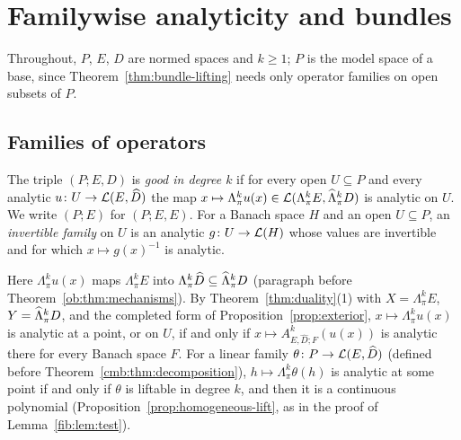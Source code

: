 \section{Familywise analyticity and bundles}\label{sec:families}

Throughout, $P$, $E$, $D$ are normed spaces and $k\ge1$; $P$ is the model space of a base, since
Theorem~\ref{thm:bundle-lifting} needs only operator families on open subsets of $P$.

\subsection{Families of operators}\label{fam2:ssec:framework}

\begin{definition}\label{fam2:def:good}
The triple $(P;E,D)$ is \emph{good in degree $k$} if for every open $U\subseteq P$ and every analytic
$u\colon U\to\mathcal L(E,\widehat D)$ the map $x\mapsto\Lambda^k_\pi u(x)\in\mathcal L(\Lambda^k_\pi E,\widehat\Lambda^k_\pi D)$ is analytic on
$U$. We write $(P;E)$ for $(P;E,E)$. For a Banach space $H$ and an open $U\subseteq P$, an \emph{invertible family} on $U$
is an analytic $g\colon U\to\mathcal L(H)$ whose values are invertible and for which $x\mapsto g(x)^{-1}$ is analytic.
\end{definition}

Here $\Lambda^k_\pi u(x)$ maps $\Lambda^k_\pi E$ into $\Lambda^k_\pi\widehat D\subseteq\widehat\Lambda^k_\pi D$ (paragraph before
Theorem~\ref{ob:thm:mechanisms}). By Theorem~\ref{thm:duality}(1) with $X=\Lambda^k_\pi E$, $Y=\widehat\Lambda^k_\pi D$, and the
completed form of Proposition~\ref{prop:exterior}, $x\mapsto\Lambda^k_\pi u(x)$ is analytic at a point, or on $U$, if and
only if $x\mapsto A^k_{E,\widehat D;F}(u(x))$ is analytic there for every Banach space $F$. For a linear family
$\theta\colon P\to\mathcal L(E,\widehat D)$ (defined before Theorem~\ref{cmb:thm:decomposition}), $h\mapsto\Lambda^k_\pi\theta(h)$ is analytic at some
point if and only if $\theta$ is liftable in degree $k$, and then it is a continuous polynomial
(Proposition~\ref{prop:homogeneous-lift}, as in the proof of Lemma~\ref{fib:lem:test}).

